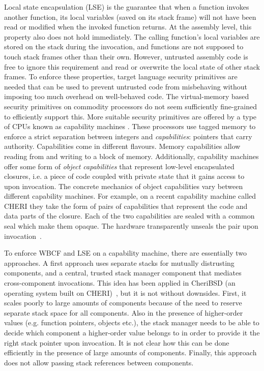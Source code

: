 \documentclass[acmsmall,review,showframe]{acmart}\settopmatter{printfolios=true,printccs=false,printacmref=false}
\begin{document}
Local state encapsulation (LSE) is the guarantee that when a function invokes another function, its local variables (saved on its stack frame) will not have been read or modified when the invoked function returns.
At the assembly level, this property also does not hold immediately.
The calling function's local variables are stored on the stack during the invocation, and functions are not supposed to touch stack frames other than their own.
However, untrusted assembly code is free to ignore this requirement and read or overwrite the local state of other stack frames.
To enforce these properties, target language security primitives are needed that can be used to prevent untrusted code from misbehaving without imposing too much overhead on well-behaved code.
The virtual-memory based security primitives on commodity processors do not seem sufficiently fine-grained to efficiently support this.
More suitable security primitives are offered by a type of CPUs known as capability machines \citep{levy_capability-based_1984,watson_cheri:_2015}.
These processors use tagged memory to enforce a strict separation between integers and {\itshape capabilities}: pointers that carry authority.
Capabilities come in different flavours.
Memory capabilities allow reading from and writing to a block of memory.
Additionally, capability machines offer some form of {\itshape object capabilities} that represent low-level encapsulated closures, i.e. a piece of code coupled with private state that it gains access to upon invocation.
The concrete mechanics of object capabilities vary between different capability machines.
For example, on a recent capability machine called CHERI they take the form of pairs of capabilities that represent the code and data parts of the closure.
Each of the two capabilities are sealed with a common seal which make them opaque.
The hardware transparently unseals the pair upon invocation~\citep{watson_capability_2015,watson_fast_2016}.

To enforce WBCF and LSE on a capability machine, there are essentially two approaches.
A first approach uses separate stacks for mutually distrusting components, and a central, trusted stack manager component that mediates cross-component invocations.
This idea has been applied in CheriBSD (an operating system built on CHERI)~\citep{watson_capability_2015}, but it is not without downsides.
First, it scales poorly to large amounts of components because of the need to reserve separate stack space for all components.
Also in the presence of higher-order values (e.g. function pointers, objects etc.), the stack manager needs to be able to decide which component a higher-order value belongs to in order to provide it the right stack pointer upon invocation.
It is not clear how this can be done efficiently in the presence of large amounts of components.
Finally, this approach does not allow passing stack references between components.
\end{document}
